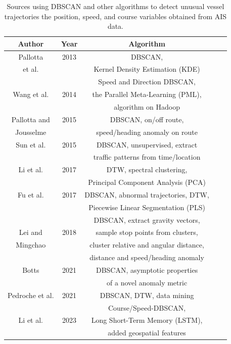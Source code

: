 \documentclass[preprint,12pt]{elsarticle}
\begin{document}
\begin{table}[!ht]
    \centering
    \begin{tabular}{|c|c|c|c|c|}
        \hline
        Author & Year & Algorithm \\ \hline
        Pallotta & 2013 & DBSCAN, \\
        et al. \cite{2013Pallotta2} & & Kernel Density Estimation (KDE) \\ \hline
         & & Speed and Direction DBSCAN, \\
        Wang et al. \cite{2014Wang} & 2014 & the Parallel Meta-Learning (PML), \\
         & & algorithm on Hadoop \\ \hline
        Pallotta and & 2015 & DBSCAN, on/off route, \\
        Jousselme \cite{2015Pallotta} & & speed/heading anomaly on route \\ \hline
        Sun et al. \cite{2015Sun} & 2015 & DBSCAN, unsupervised, extract \\
         & & traffic patterns from time/location \\ \hline
         Li et al. \cite{Li2017ADR} & 2017 & DTW, spectral clustering, \\
         & & Principal Component Analysis (PCA) \\ \hline
        Fu et al. \cite{2017Fu} & 2017 & DBSCAN, abnormal trajectories, DTW, \\
         & & Piecewise Linear Segmentation (PLS) \\ \hline
         & & DBSCAN, extract gravity vectors, \\
        Lei and & 2018 & sample stop points from clusters, \\
        Mingchao \cite{2018Lei} & & cluster relative and angular distance, \\
         & & distance  and speed/heading anomaly \\ \hline
        Botts \cite{2021Botts} & 2021 & DBSCAN, asymptotic properties \\
         & & of a novel anomaly metric \\ \hline
        Pedroche et al. \cite{2021Pedroche} & 2021 & DBSCAN, DTW, data mining \\ \hline
         & & Course/Speed-DBSCAN, \\
        Li et al. \cite{2023Li} & 2023 & Long Short-Term Memory (LSTM), \\
         & & added geospatial features \\ \hline
    \end{tabular}
    \caption{Sources using DBSCAN and other algorithms to detect unusual vessel trajectories the position, speed, and course variables obtained from AIS data.}
    \label{tab:DBSCANdetect}
\end{table}
\end{document}
